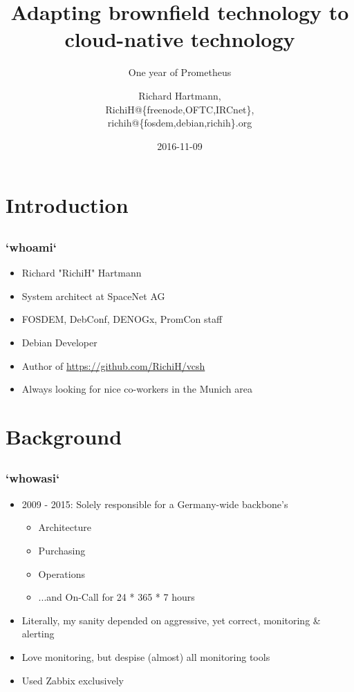 \documentclass[t]{beamer}
\title{Adapting brownfield technology to cloud-native technology}
\subtitle{One year of Prometheus}
\author{Richard Hartmann,\\
RichiH@\{freenode,OFTC,IRCnet\},\\
richih@\{fosdem,debian,richih\}.org}
\date{2016-11-09}
\begin{document}
\setcounter{tocdepth}{1}

\begin{frame}
	\titlepage
\end{frame}


\section{Introduction}

\subsection{}

\begin{frame}
	\frametitle{`whoami`}
	\begin{itemize}
		\item Richard "RichiH" Hartmann
		\item System architect at SpaceNet AG
		\item FOSDEM, DebConf, DENOGx, PromCon staff
		\item Debian Developer
		\item Author of \url{https://github.com/RichiH/vcsh}
		\item Always looking for nice co-workers in the Munich area
	\end{itemize}
\end{frame}


\section{Background}

\subsection{}

\begin{frame}
	\frametitle{`whowasi`}
	\begin{itemize}
		\item 2009 - 2015: Solely responsible for a Germany-wide backbone's
		\begin{itemize}
			\item Architecture
			\item Purchasing
			\item Operations
			\item ...and On-Call for 24 * 365 * 7 hours
		\end{itemize}
		\item Literally, my sanity depended on aggressive, yet correct, monitoring \& alerting
		\item Love monitoring, but despise (almost) all monitoring tools
		\item Used Zabbix exclusively
	\end{itemize}
\end{frame}
\end{document}
